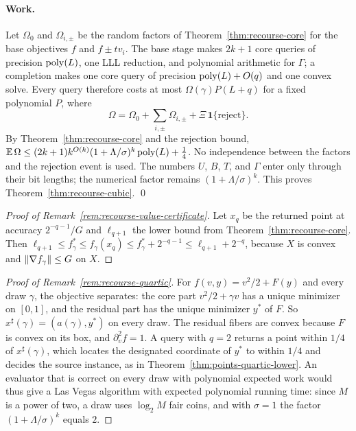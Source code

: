 \paragraph{Work.}
Let $\Omega_0$ and $\Omega_{i,\pm}$ be the random factors of
Theorem~\ref{thm:recourse-core} for the base objectives $f$ and
$f\pm tv_i$. The base stage makes $2k+1$ core queries of precision
$\operatorname{poly}(L)$, one LLL reduction, and polynomial arithmetic for $\Gamma$; a
completion makes one core query of precision $\operatorname{poly}(L)+O(q)$ and one
convex solve. Every query therefore costs at most $\Omega(\gamma)P(L+q)$
for a fixed polynomial $P$, where
\[
 \Omega=\Omega_0+\sum_{i,\pm}\Omega_{i,\pm}+\Xi\,\mathbf1\{\text{reject}\}.
\]
By Theorem~\ref{thm:recourse-core} and the rejection bound,
$\mathbb E\,\Omega\le(2k+1)k^{O(k)}(1+\Lambda/\sigma)^k\operatorname{poly}(L)+\frac14$. No
independence between the factors and the rejection event is used. The
numbers $U$, $B$, $T$, and $\Gamma$ enter only through their bit lengths;
the numerical factor remains $(1+\Lambda/\sigma)^k$. This proves
Theorem~\ref{thm:recourse-cubic}. \qed

\begin{proof}[Proof of Remark~\ref{rem:recourse-value-certificate}]
Let $x_q$ be the returned point at accuracy $2^{-q-1}/G$ and $\ell_{q+1}$
the lower bound from Theorem~\ref{thm:recourse-core}. Then
$\ell_{q+1}\le f_\gamma^*\le f_\gamma(x_q)\le f_\gamma^*+2^{-q-1}\le
\ell_{q+1}+2^{-q}$, because $X$ is convex and $\left\lVert\nabla f_\gamma\right\rVert\le G$
on $X$.
\end{proof}

\begin{proof}[Proof of Remark~\ref{rem:recourse-quartic}]
For $f(v,y)=v^2/2+F(y)$ and every draw $\gamma$, the objective separates:
the core part $v^2/2+\gamma v$ has a unique minimizer on $[0,1]$, and the
residual part has the unique minimizer $y^*$ of $F$. So
$x^\sharp(\gamma)=(a(\gamma),y^*)$ on every draw. The residual fibers are
convex because $F$ is convex on its box, and $\partial_v^2f=1$. A query
with $q=2$ returns a point within $1/4$ of $x^\sharp(\gamma)$, which
locates the designated coordinate of $y^*$ to within $1/4$ and decides
the source instance, as in Theorem~\ref{thm:points-quartic-lower}. An
evaluator that is correct on every draw with polynomial expected work
would thus give a Las Vegas algorithm with expected polynomial running
time: since $M$ is a power of two, a draw uses $\log_2M$ fair coins, and
with $\sigma=1$ the factor $(1+\Lambda/\sigma)^k$ equals $2$.
\end{proof}
